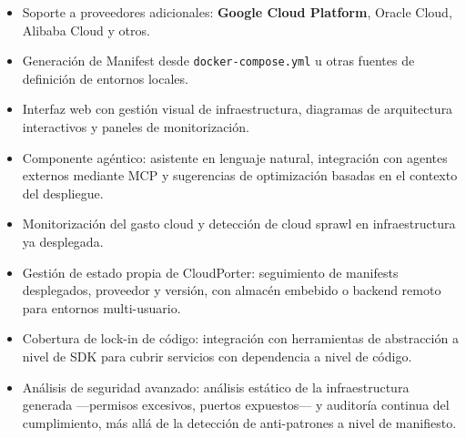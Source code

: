 \begin{itemize}
    \item Soporte a proveedores adicionales: \textbf{Google Cloud Platform},
    Oracle Cloud, Alibaba Cloud y otros.

    \item Generación de Manifest desde \texttt{docker-compose.yml} u otras
    fuentes de definición de entornos locales.

    \item Interfaz web con gestión visual de infraestructura, diagramas
    de arquitectura interactivos y paneles de monitorización.

    \item Componente agéntico: asistente en lenguaje natural, integración
    con agentes externos mediante MCP y sugerencias de optimización
    basadas en el contexto del despliegue.

    \item Monitorización del gasto cloud y detección de cloud sprawl en
    infraestructura ya desplegada.
    
    \item Gestión de estado propia de CloudPorter: seguimiento de manifests
    desplegados, proveedor y versión, con almacén embebido o backend remoto
    para entornos multi-usuario.

    \item Cobertura de lock-in de código: integración con herramientas de
    abstracción a nivel de SDK para cubrir servicios con dependencia a nivel
    de código.

    \item Análisis de seguridad avanzado: análisis estático de la infraestructura
    generada —permisos excesivos, puertos expuestos— y auditoría continua del
    cumplimiento, más allá de la detección de anti-patrones a nivel de manifiesto.

\end{itemize}
